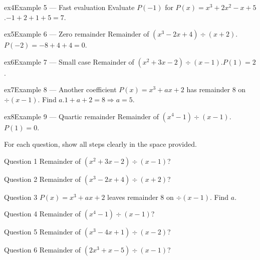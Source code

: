 \documentclass[11pt]{article}
\begin{document}
\begin{example}{ex4}{Example 5 --- Fast evaluation}
Evaluate $P(-1)$ for $P(x)=x^3+2x^2-x+5$.\soln $-1+2+1+5=7$.
\end{example}

\begin{example}{ex5}{Example 6 --- Zero remainder}
Remainder of $(x^3-2x+4)\div(x+2)$.\soln $P(-2)=-8+4+4=0$.
\end{example}

\begin{example}{ex6}{Example 7 --- Small case}
Remainder of $(x^2+3x-2)\div(x-1)$.\soln $P(1)=2$.
\end{example}

\begin{example}{ex7}{Example 8 --- Another coefficient}
$P(x)=x^3+ax+2$ has remainder $8$ on $\div(x-1)$. Find $a$.\soln $1+a+2=8\Rightarrow a=5$.
\end{example}

\begin{example}{ex8}{Example 9 --- Quartic remainder}
Remainder of $(x^4-1)\div(x-1)$.\soln $P(1)=0$.
\end{example}

\clearpage
{}
For each question, show all steps clearly in the space provided.

\begin{qbox}{Question 1}
Remainder of $(x^2+3x-2)\div(x-1)$?\workspace{2.4cm}
\end{qbox}

\begin{qbox}{Question 2}
Remainder of $(x^3-2x+4)\div(x+2)$?\workspace{2.4cm}
\end{qbox}

\begin{qbox}{Question 3}
$P(x)=x^3+ax+2$ leaves remainder $8$ on $\div(x-1)$. Find $a$.\workspace{2.4cm}
\end{qbox}

\begin{qbox}{Question 4}
Remainder of $(x^4-1)\div(x-1)$?\workspace{2.4cm}
\end{qbox}

\begin{qbox}{Question 5}
Remainder of $(x^3-4x+1)\div(x-2)$?\workspace{2.4cm}
\end{qbox}

\begin{qbox}{Question 6}
Remainder of $(2x^3+x-5)\div(x-1)$?\workspace{2.4cm}
\end{qbox}
\end{document}
